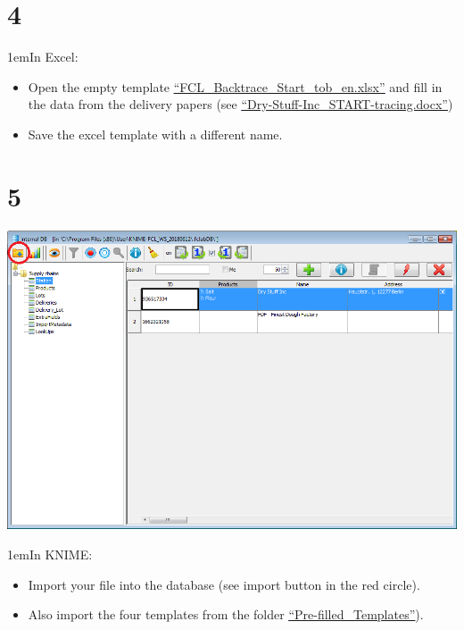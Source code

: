 \documentclass[10pt]{beamer}
\begin{document}
\section{4}
\begin{frame}
\leftskip1em{In Excel:}
	\begin{itemize}
		\item Open the empty template \textcolor{blue}{\underline{\href{https://foodrisklabs.bfr.bund.de/wp-content/uploads/2015/11/FCL\_Backtrace\_Start\_tob\_en.xlsx}{``FCL\_Backtrace\_Start\_tob\_en.xlsx''}}} and fill in the data from the delivery papers (see \textcolor{blue}{\underline{\href{https://github.com/SiLeBAT/BfROpenLabResources/raw/master/GitHubPages/documents/FCL\_Data\_collection\_and\_import/Dry-Stuff-Inc_START-tracing.docx}{``Dry-Stuff-Inc\_START-tracing.docx''}}})
		\item Save the excel template with a different name.
	\end{itemize}
\end{frame}

\section{5}
\begin{frame}
	\begin{center}
			\includegraphics[height=0.6\textheight]{5.png}
	\end{center}
\leftskip1em{In KNIME:}
	\begin{itemize}
		\item Import your file into the database (see import button in the red circle).
		\item Also import the four templates from the folder  \textcolor{blue}{\underline{\href{https://github.com/SiLeBAT/BfROpenLabResources/raw/master/GitHubPages/documents/FCL\_Data\_collection\_and\_import/Pre-filled\_Templates}{``Pre-filled\_Templates''}}}).
	\end{itemize}
\end{frame}
\end{document}
